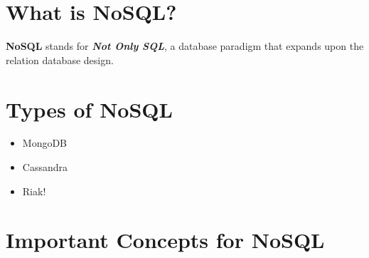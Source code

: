 \section{What is NoSQL?}
\textbf{NoSQL} stands for \textbf{\textit{Not Only SQL}}, a database paradigm that expands upon the relation database design.

\section{Types of NoSQL}
\begin{itemize}
\item MongoDB
\item Cassandra
\item Riak!
\end{itemize}
\newpage
\section{Important Concepts for NoSQL}



